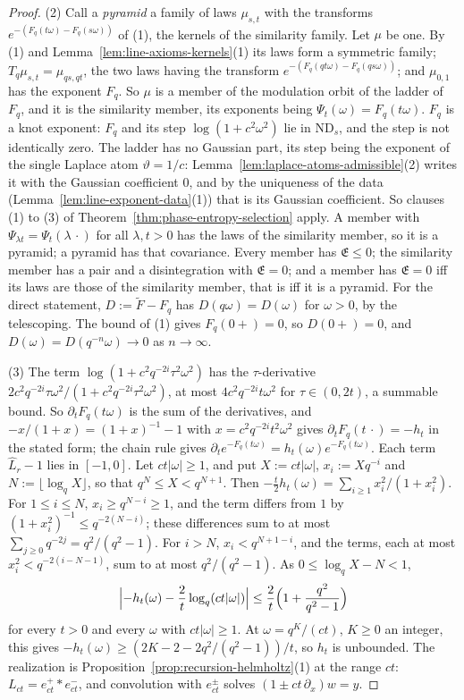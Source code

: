 \begin{proof}
(2) Call a \emph{\Matern{} pyramid} a family of laws $\mu_{s,t}$ with the transforms
$e^{-(F_q(t\omega) - F_q(s\omega))}$ of (1), the kernels of the similarity family. Let $\mu$ be one.
By (1) and Lemma~\ref{lem:line-axioms-kernels}(1) its laws
form a symmetric family; $T_q\mu_{s,t} = \mu_{qs,qt}$, the two laws having the transform
$e^{-(F_q(qt\omega) - F_q(qs\omega))}$; and $\mu_{0,1}$ has the exponent $F_q$. So $\mu$ is a member
of the modulation orbit of the ladder of $F_q$, and it is the similarity member, its exponents
being $\Psi_t(\omega) = F_q(t\omega)$. $F_q$ is a knot exponent: $F_q$ and its step
$\log(1 + c^2\omega^2)$ lie in $\mathrm{ND}_s$, and the step is not identically zero. The ladder
has no Gaussian part, its step being the exponent of the single Laplace atom $\vartheta = 1/c$:
Lemma~\ref{lem:laplace-atoms-admissible}(2) writes it with the Gaussian coefficient $0$, and by the
uniqueness of the data (Lemma~\ref{lem:line-exponent-data}(1)) that is its Gaussian coefficient.
So clauses (1)
to (3) of Theorem~\ref{thm:phase-entropy-selection} apply. A member with
$\Psi_{\lambda t} = \Psi_t(\lambda\,\cdot)$ for all $\lambda, t > 0$ has the laws of the similarity
member, so it is a \Matern{} pyramid; a \Matern{} pyramid has that covariance. Every member has
$\mathfrak{E} \le 0$; the similarity member has a pair and a disintegration with
$\mathfrak{E} = 0$; and a member has $\mathfrak{E} = 0$ iff its laws are those of the similarity
member, that is iff it is a \Matern{} pyramid. For the direct statement, $D := \tilde F - F_q$ has
$D(q\omega) = D(\omega)$ for $\omega > 0$, by the telescoping. The bound of (1) gives
$F_q(0{+}) = 0$, so $D(0{+}) = 0$, and $D(\omega) = D(q^{-n}\omega) \to 0$ as $n \to \infty$.

(3) The term $\log(1 + c^2q^{-2i}\tau^2\omega^2)$ has the $\tau$-derivative
$2c^2q^{-2i}\tau\omega^2/(1 + c^2q^{-2i}\tau^2\omega^2)$, at most $4c^2q^{-2i}t\omega^2$ for
$\tau \in (0, 2t)$, a summable bound. So $\partial_tF_q(t\omega)$ is the sum of the derivatives,
and $-x/(1 + x) = (1 + x)^{-1} - 1$ with $x = c^2q^{-2i}t^2\omega^2$ gives
$\partial_tF_q(t\,\cdot) = -h_t$ in the stated form; the chain rule gives
$\partial_te^{-F_q(t\omega)} = h_t(\omega)e^{-F_q(t\omega)}$. Each term $\widehat L_r - 1$ lies
in $[-1, 0]$. Let $ct|\omega| \ge 1$, and put $X := ct|\omega|$, $x_i := Xq^{-i}$ and
$N := \lfloor\log_qX\rfloor$, so that $q^N \le X < q^{N+1}$. Then
$-\tfrac t2h_t(\omega) = \sum_{i \ge 1}x_i^2/(1 + x_i^2)$. For $1 \le i \le N$,
$x_i \ge q^{N-i} \ge 1$, and the term differs from $1$ by $(1 + x_i^2)^{-1} \le q^{-2(N-i)}$; these
differences sum to at most $\sum_{j \ge 0}q^{-2j} = q^2/(q^2 - 1)$. For $i > N$,
$x_i < q^{N+1-i}$, and the terms, each at most $x_i^2 < q^{-2(i-N-1)}$, sum to at most
$q^2/(q^2 - 1)$. As $0 \le \log_qX - N < 1$,
\[
  \Bigl|-h_t(\omega) - \frac2t\log_q(ct|\omega|)\Bigr| \le \frac2t\Bigl(1 + \frac{q^2}{q^2 - 1}\Bigr)
\]
for every $t > 0$ and every $\omega$ with $ct|\omega| \ge 1$. At $\omega = q^K/(ct)$, $K \ge 0$ an
integer, this gives $-h_t(\omega) \ge (2K - 2 - 2q^2/(q^2 - 1))/t$, so $h_t$ is unbounded. The
realization is Proposition~\ref{prop:recursion-helmholtz}(1) at the range $ct$:
$L_{ct} = e^+_{ct} * e^-_{ct}$, and convolution with $e^\pm_{ct}$ solves $(1 \pm ct\,\partial_x)w = y$.


\end{proof}
